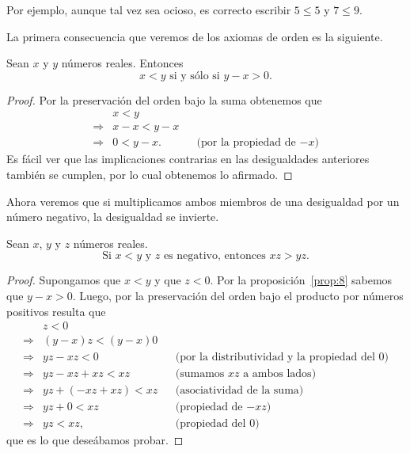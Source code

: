 \documentclass[12pt,a4paper]{book}
\begin{document}
    Por ejemplo, aunque tal vez sea ocioso, es correcto escribir $5\leq 5$ y $7\leq 9$.

    La primera consecuencia que veremos de los axiomas de orden es la siguiente.

    \begin{proposicion}\label{prop:8}
        Sean $x$ y $y$ números reales. Entonces
        \begin{equation*}
            x<y\text{ si y sólo si }y-x>0.
        \end{equation*}
    \end{proposicion}

    \begin{proof}
        Por la preservación del orden bajo la suma obtenemos que
        \begin{align*}
            &x<y\\
            \Rightarrow{}& x-x<y-x\\
            \Rightarrow{}& 0<y-x. &&\text{(por la propiedad de $-x$)}
        \end{align*}
        Es fácil ver que las implicaciones contrarias en las desigualdades anteriores
        también se cumplen, por lo cual obtenemos lo afirmado.
    \end{proof}

    Ahora veremos que si multiplicamos ambos miembros de una desigualdad
    por un número negativo, la desigualdad se invierte.

    \begin{proposicion}\label{prop:9}
        Sean $x$, $y$ y $z$ números reales.
        \begin{equation*}
            \text{Si }x<y\text{ y }z\text{ es negativo, entonces }xz>yz.
        \end{equation*}
    \end{proposicion}

    \begin{proof}
        Supongamos que $x<y$ y que $z<0$. Por la proposición~\ref{prop:8}
        sabemos que $y-x>0$. Luego, por la preservación del orden bajo el producto
        por números positivos resulta que
        \begin{align*}
            &z<0\\
            \Rightarrow{}& (y-x)z<(y-x)0\\
            \Rightarrow{}& yz-xz<0 &&\text{(por la distributividad y la propiedad del $0$)}\\
            \Rightarrow{}& yz-xz+xz<xz &&\text{(sumamos $xz$ a ambos lados)}\\
            \Rightarrow{}& yz+(-xz+xz)<xz &&\text{(asociatividad de la suma)}\\
            \Rightarrow{}& yz+0<xz &&\text{(propiedad de $-xz$)}\\
            \Rightarrow{}& yz<xz, &&\text{(propiedad del $0$)}
        \end{align*}
        que es lo que deseábamos probar.
    \end{proof}
\end{document}
